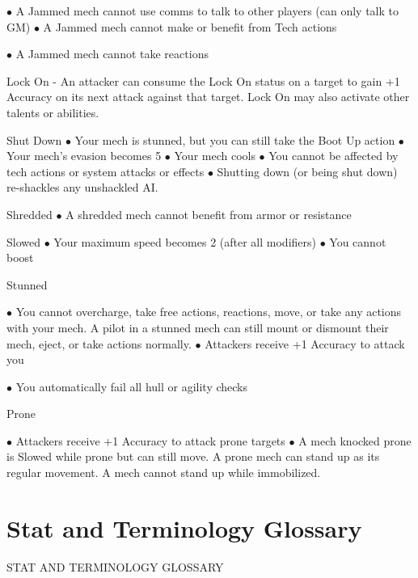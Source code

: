     $\bullet$    A Jammed mech cannot use comms to talk to other players (can only talk to GM)
    $\bullet$    A Jammed mech cannot make or benefit from Tech actions

    $\bullet$    A Jammed mech cannot take reactions

Lock On
    -   An attacker can consume the Lock On status on a target to gain +1 Accuracy on its next
        attack against that target. Lock On may also activate other talents or abilities.

Shut Down
    $\bullet$    Your mech is stunned, but you can still take the Boot Up action
    $\bullet$    Your mech’s evasion becomes 5
    $\bullet$    Your mech cools
    $\bullet$    You cannot be affected by tech actions or system attacks or effects
    $\bullet$    Shutting down (or being shut down) re-shackles any unshackled AI.

Shredded
    $\bullet$    A shredded mech cannot benefit from armor or resistance





Slowed
     $\bullet$    Your maximum speed becomes 2 (after all modifiers)
     $\bullet$    You cannot boost

Stunned

     $\bullet$    You cannot overcharge, take free actions, reactions, move, or take any actions with your
         mech. A pilot in a stunned mech can still mount or dismount their mech, eject, or take
         actions normally.
     $\bullet$    Attackers receive +1 Accuracy to attack you

     $\bullet$    You automatically fail all hull or agility checks

Prone

     $\bullet$    Attackers receive +1 Accuracy to attack prone targets
     $\bullet$    A mech knocked prone is Slowed while prone but can still move. A prone mech can stand
         up as its regular movement. A mech cannot stand up while immobilized.
\chapter{Stat and Terminology Glossary}
                          STAT AND TERMINOLOGY GLOSSARY

